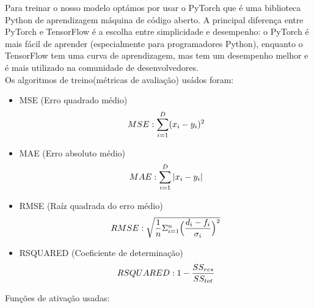 \documentclass[10pt]{article}
\begin{document}
Para treinar o nosso modelo optámos por usar o PyTorch que é uma biblioteca Python de aprendizagem máquina de código aberto.
A principal diferença entre PyTorch e TensorFlow é a escolha entre simplicidade e desempenho: o PyTorch é mais fácil de aprender
(especialmente para programadores Python), enquanto o TensorFlow tem uma curva de aprendizagem, mas tem um desempenho melhor e é mais utilizado na comunidade de desenvolvedores.
\vspace{1cm}
\\Os algoritmos de treino(métricas de avaliação) usádos foram: 
\vspace{1cm}
\begin{itemize}
\item MSE (Erro quadrado médio)
\vspace{1cm}
\begin{equation}
  \vspace{1cm}
  MSE : \sum_{i=1}^{D}(x_i-y_i)^2
\end{equation}
\item MAE (Erro absoluto médio)
\vspace{1cm}
\begin{equation}
  \vspace{1cm}
  MAE : \sum_{i=1}^{D}|x_i-y_i|
\end{equation}
\item RMSE (Raíz quadrada do erro médio)
\vspace{1cm}
\begin{equation}
  \vspace{1cm}
  RMSE : \sqrt{\frac{1}{n}\Sigma_{i=1}^{n}{\Big(\frac{d_i -f_i}{\sigma_i}\Big)^2}}
\end{equation}
\item RSQUARED (Coeficiente de determinação)
\vspace{1cm}
\begin{equation}
  \vspace{1cm}
  RSQUARED : 1 - \frac{SS_{res}}{SS_{tot}}
\end{equation}
\newpage
\end{itemize}
Funções de ativação usadas:
\vspace{1cm}
\end{document}

